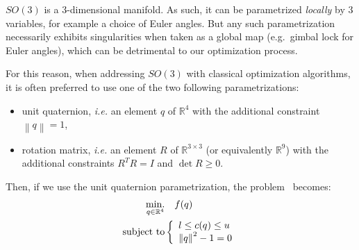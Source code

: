 $SO(3)$ is a 3-dimensional manifold.
As such, it can be parametrized \emph{locally} by $3$ variables, for example a choice of Euler angles. But any such parametrization necessarily exhibits singularities when taken as a global map (e.g.\ gimbal lock for Euler angles), which can be detrimental to our optimization process.

For this reason, when addressing $SO(3)$ with classical optimization algorithms, it is often preferred to use one of the two following parametrizations:
\begin{itemize}
    \item unit quaternion, \emph{i.e.} an element $q$ of $\mathbb{R}^4$ with the additional constraint $\left\|q\right\| = 1$,
    \item rotation matrix, \emph{i.e.} an element $R$ of $\mathbb{R}^{3 \times 3}$ (or equivalently $\mathbb{R}^9$) with the additional constraints $R^T R = I$ and $\det{R} \geq 0$.
\end{itemize}

Then, if we use the unit quaternion parametrization, the problem~ becomes:
\begin{align}
\label{eq:pb_on_SO3_quaternion}
  \operatorname*{min.}_{q \in \mathbb{R}^4} & \quad f(q)\\
  \text{subject to}&
  \left\{\begin{array}{lr}
    {l} \leq c(q) \leq {u} \nonumber\\
    {\|q\|}^2 - 1 = 0
  \end{array}\right.
\end{align}

